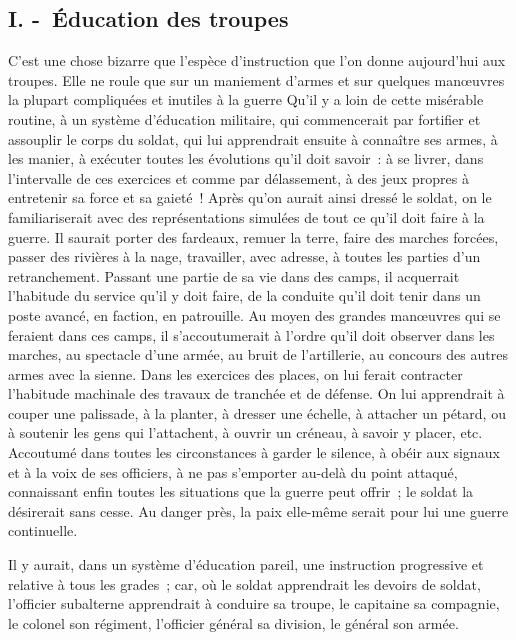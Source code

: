 \documentclass[french,twoside]{book} %
\begin{document}
\subsection[{I. - Éducation des troupes}]{I. - Éducation des troupes}
\noindent C’est une chose bizarre que l’espèce d’instruction que l’on donne aujourd’hui aux troupes. Elle ne roule que sur un maniement d’armes et sur quelques manœuvres la plupart compliquées et inutiles à la guerre Qu’il y a loin de cette misérable routine, à un système d’éducation militaire, qui commencerait par fortifier et assouplir le corps du soldat, qui lui apprendrait ensuite à connaître ses armes, à les manier, à exécuter toutes les évolutions qu’il doit savoir : à se livrer, dans l’intervalle de ces exercices et comme par délassement, à des jeux propres à entretenir sa force et sa gaieté ! Après qu’on aurait ainsi dressé le soldat, on le familiariserait avec des représentations simulées de tout ce qu’il doit faire à la guerre. Il saurait porter des fardeaux, remuer la terre, faire des marches forcées, passer des rivières à la nage, travailler, avec adresse, à toutes les parties d’un retranchement. Passant une partie de sa vie dans des camps, il acquerrait l’habitude du service qu’il y doit faire, de la conduite qu’il doit tenir dans un poste avancé, en faction, en patrouille. Au moyen des grandes manœuvres qui se feraient dans ces camps, il s’accoutumerait à l’ordre qu’il doit observer dans les marches, au spectacle d’une armée, au bruit de l’artillerie, au concours des autres armes avec la sienne. Dans les exercices des places, on lui ferait contracter l’habitude machinale des travaux de tranchée et de défense. On lui apprendrait à couper une palissade, à la planter, à dresser une échelle, à attacher un pétard, ou à soutenir les gens qui l’attachent, à ouvrir un créneau, à savoir y placer, etc. Accoutumé dans toutes les circonstances à garder le silence, à obéir aux signaux et à la voix de ses officiers, à ne pas s’emporter au-delà du point attaqué, connaissant enfin toutes les situations que la guerre peut offrir ; le soldat la désirerait sans cesse. Au danger près, la paix elle-même serait pour lui une guerre continuelle.\par
Il y aurait, dans un système d’éducation pareil, une instruction progressive et relative à tous les grades ; car, où le soldat apprendrait les devoirs de soldat, l’officier subalterne apprendrait à conduire sa troupe, le capitaine sa compagnie, le colonel son régiment, l’officier général sa division, le général son armée.\par
\end{document}
